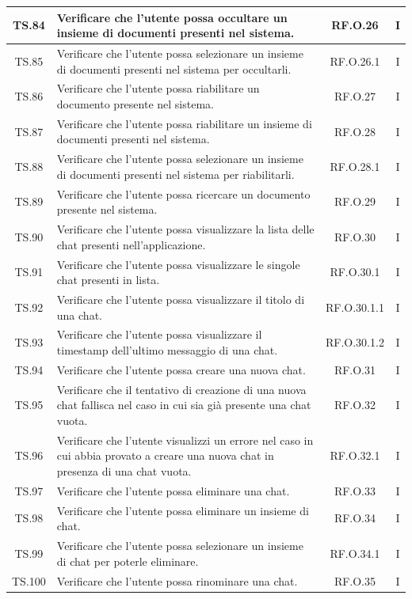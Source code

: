 \documentclass[10pt, a4paper]{article}
\begin{document}
\begin{xltabular}{\textwidth}{|c|X|c|c|}
\hline
TS.84 & Verificare che l'utente possa occultare un insieme di documenti presenti nel sistema. & RF.O.26 & I \\
\hline
TS.85 & Verificare che l'utente possa selezionare un insieme di documenti presenti nel sistema per occultarli. & RF.O.26.1 & I \\
\hline
TS.86 & Verificare che l'utente possa riabilitare un documento presente nel sistema. & RF.O.27 & I \\
\hline
TS.87 & Verificare che l'utente possa riabilitare un insieme di documenti presenti nel sistema. & RF.O.28 & I \\
\hline
TS.88 & Verificare che l'utente possa selezionare un insieme di documenti presenti nel sistema per riabilitarli. & RF.O.28.1 & I \\
\hline
TS.89 & Verificare che l'utente possa ricercare un documento presente nel sistema. & RF.O.29 & I \\
\hline
TS.90 & Verificare che l'utente possa visualizzare la lista delle chat presenti nell’applicazione. & RF.O.30 & I \\
\hline
TS.91 & Verificare che l'utente possa visualizzare le singole chat presenti in lista. & RF.O.30.1 & I \\
\hline
TS.92 & Verificare che l'utente possa visualizzare il titolo di una chat. & RF.O.30.1.1 & I \\
\hline
TS.93 & Verificare che l'utente possa visualizzare il timestamp dell’ultimo messaggio di una chat. & RF.O.30.1.2 & I \\
\hline
TS.94 & Verificare che l'utente possa creare una nuova chat. & RF.O.31 & I \\
\hline
TS.95 & Verificare che il tentativo di creazione di una nuova chat fallisca nel caso in cui sia già presente una chat vuota. & RF.O.32 & I \\
\hline
TS.96 & Verificare che l'utente visualizzi un errore nel caso in cui abbia provato a creare una nuova chat in presenza di una chat vuota. & RF.O.32.1 & I \\
\hline
TS.97 & Verificare che l'utente possa eliminare una chat. & RF.O.33 & I \\
\hline
TS.98 & Verificare che l'utente possa eliminare un insieme di chat. & RF.O.34 & I \\
\hline
TS.99 & Verificare che l'utente possa selezionare un insieme di chat per poterle eliminare. & RF.O.34.1 & I \\
\hline
TS.100 & Verificare che l'utente possa rinominare una chat. & RF.O.35 & I \\

\end{xltabular}
\end{document}
